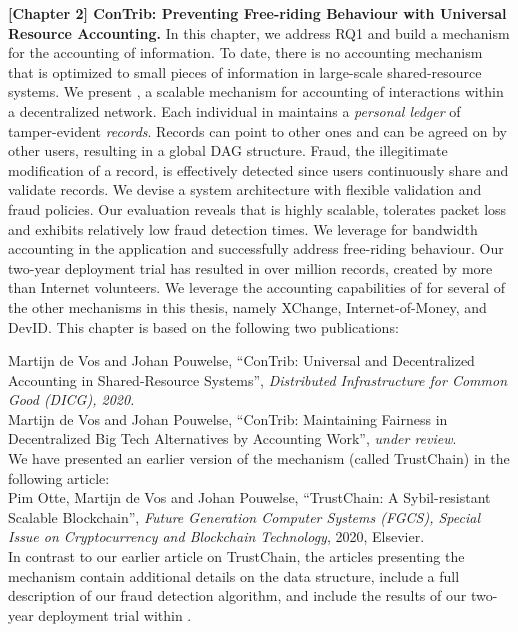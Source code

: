 \textbf{[Chapter 2] ConTrib: Preventing Free-riding Behaviour with Universal Resource Accounting.}
In this chapter, we address RQ1 and build a mechanism for the accounting of information.
To date, there is no accounting mechanism that is optimized to small pieces of information in large-scale shared-resource systems.
We present \TrustChain{}, a scalable mechanism for accounting of interactions within a decentralized network.
Each individual in \TrustChain{} maintains a \emph{personal ledger} of tamper-evident \emph{records}.
Records can point to other ones and can be agreed on by other users, resulting in a global DAG structure.
Fraud, the illegitimate modification of a record, is effectively detected since users continuously share and validate records.
We devise a system architecture with flexible validation and fraud policies.
Our evaluation reveals that \TrustChain{} is highly scalable, tolerates packet loss and exhibits relatively low fraud detection times.
We leverage \TrustChain{} for bandwidth accounting in the \Tribler{} application and successfully address free-riding behaviour.
Our two-year deployment trial has resulted in over \TrialRecords{} million records, created by more than \TrialUsers{} Internet volunteers.
We leverage the accounting capabilities of \TrustChain{} for several of the other mechanisms in this thesis, namely XChange, Internet-of-Money, and DevID.
This chapter is based on the following two publications:

Martijn de Vos and Johan Pouwelse, \enquote{ConTrib: Universal and Decentralized Accounting in Shared-Resource Systems}, \emph{Distributed Infrastructure for Common Good (DICG), 2020.}\\

Martijn de Vos and Johan Pouwelse, \enquote{ConTrib: Maintaining Fairness in Decentralized Big Tech Alternatives by Accounting Work}, \emph{under review}.\\

\noindent We have presented an earlier version of the \TrustChain{} mechanism (called TrustChain) in the following article:\\

Pim Otte, Martijn de Vos and Johan Pouwelse, \enquote{TrustChain: A Sybil-resistant Scalable Blockchain}, \emph{Future Generation Computer Systems (FGCS), Special Issue on Cryptocurrency and Blockchain Technology}, 2020, Elsevier.\\

In contrast to our earlier article on TrustChain, the articles presenting the \TrustChain{} mechanism contain additional details on the data structure, include a full description of our fraud detection algorithm, and include the results of our two-year deployment trial within \Tribler{}.

